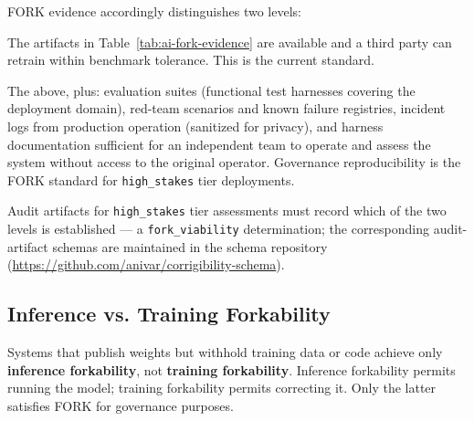 \documentclass{article}
\theoremstyle{definition}
\begin{document}
FORK evidence accordingly distinguishes two levels:
\begin{description}[noitemsep]
    \item[\textbf{Artifact-reproducible}] The artifacts in Table~\ref{tab:ai-fork-evidence} are available and a third party can retrain within benchmark tolerance. This is the current standard.
    \item[\textbf{Governance-reproducible}] The above, plus: evaluation suites (functional test harnesses covering the deployment domain), red-team scenarios and known failure registries, incident logs from production operation (sanitized for privacy), and harness documentation sufficient for an independent team to operate and assess the system without access to the original operator. Governance reproducibility is the FORK standard for \texttt{high\_stakes} tier deployments.
\end{description}

Audit artifacts for \texttt{high\_stakes} tier assessments must record which of the two levels is established --- a \texttt{fork\_viability} determination; the corresponding audit-artifact schemas are maintained in the schema repository (\url{https://github.com/anivar/corrigibility-schema}).

\subsection{Inference vs. Training Forkability}

Systems that publish weights but withhold training data or code achieve only \textbf{inference forkability}, not \textbf{training forkability}. Inference forkability permits running the model; training forkability permits correcting it. Only the latter satisfies FORK for governance purposes.
\end{document}

